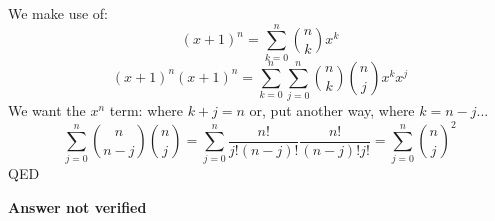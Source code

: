 We make use of:
\begin{equation}
	(x+1)^n = \sum_{k=0}^{n} \binom{n}{k} x^k
\end{equation}
\begin{equation}
	(x+1)^n(x+1)^n = \sum_{k=0}^{n}\sum_{j=0}^{n} \binom{n}{k} \binom{n}{j} x^k x^j
\end{equation}
We want the $x^n$ term: where $k+j=n$ or, put another way, where $k=n-j$...
\begin{equation}
	\sum_{j=0}^{n} \binom{n}{n-j} \binom{n}{j} = \sum_{j=0}^{n} \frac{n!}{j!(n-j)!}\frac{n!}{(n-j)!j!} = \sum_{j=0}^{n} \binom{n}{j}^2
\end{equation}
QED


\textbf{Answer not verified}


%
%
%	
